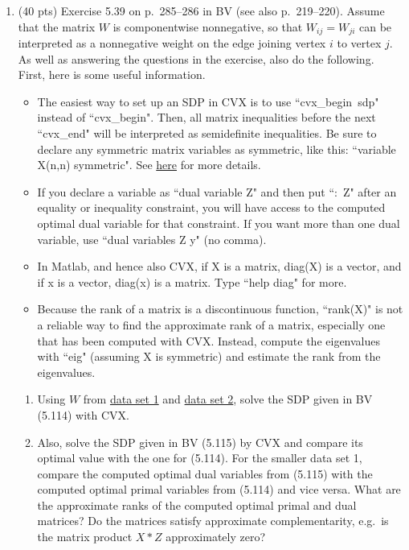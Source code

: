 \documentclass[11pt]{article}
\begin{document}
\begin{enumerate}
\begin{enumerate}
\end{enumerate}
\item (40 pts) Exercise 5.39 on p.~285--286 in BV (see also p.~219--220). 
Assume that the matrix $W$ is componentwise nonnegative, so that $W_{ij}=W_{ji}$ can be interpreted as a 
nonnegative weight on the edge joining vertex $i$ to vertex $j$. As well as answering the questions in the exercise, also do the following.
First, here is some useful information.
\begin{itemize}
\item The easiest way to set up an SDP in CVX is to use \mbox{``cvx\_begin sdp"} instead of \mbox{``cvx\_begin"}. Then, all matrix inequalities
 before the next ``cvx\_end" will be interpreted as semidefinite inequalities. Be sure to declare any symmetric matrix variables as symmetric, like this:
 ``variable X(n,n) symmetric". See
 \href{http://cvxr.com/cvx/doc/sdp.html}{here} for more details.
 \item If you declare a variable as ``dual variable Z" and then put \mbox{``: Z"} after an equality or inequality
 constraint, you will have access to the computed optimal dual variable for that constraint. If you want more
 than one dual variable, use ``dual variables Z y" (no comma).
 \item In {\sc Matlab}, and hence also CVX, if X is a matrix, diag(X) is a vector, and if x is a vector, diag(x) is a matrix. Type ``help diag" for more.
 \item Because the rank of a matrix is a discontinuous function, ``rank(X)" is not a reliable way to find the approximate rank of a matrix, especially one that has been computed with CVX. Instead, compute the eigenvalues with ``eig" (assuming X is symmetric) and estimate the rank from the
 eigenvalues.
 \end{itemize}

\begin{enumerate}
\item Using  $W$ from \href{http://www.cs.nyu.edu/overton/conv_ns_opt/hw/hw4data1.mat}{data set 1} and
 \href{http://www.cs.nyu.edu/overton/conv_ns_opt/hw/hw4data2.mat}{data set 2}, solve the SDP given in BV (5.114) with CVX.
 
 \item Also, solve the SDP given in BV (5.115) by CVX and compare its optimal value with the one for (5.114). 
 For the smaller data set 1, compare the computed optimal dual variables
 from (5.115) with the computed optimal primal variables from (5.114) and vice versa.
 What are the approximate ranks of the computed optimal primal and dual matrices? Do the matrices satisfy
 approximate complementarity, e.g.\ is the matrix product $X*Z$ approximately zero?
 

\end{enumerate}
\end{enumerate}
\end{document}
